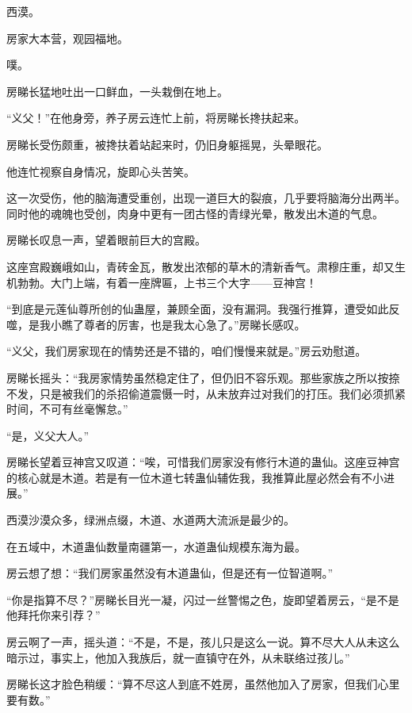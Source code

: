 
\begin{this_body}

西漠。

房家大本营，观园福地。

噗。

房睇长猛地吐出一口鲜血，一头栽倒在地上。

“义父！”在他身旁，养子房云连忙上前，将房睇长搀扶起来。

房睇长受伤颇重，被搀扶着站起来时，仍旧身躯摇晃，头晕眼花。

他连忙视察自身情况，旋即心头苦笑。

这一次受伤，他的脑海遭受重创，出现一道巨大的裂痕，几乎要将脑海分出两半。同时他的魂魄也受创，肉身中更有一团古怪的青绿光晕，散发出木道的气息。

房睇长叹息一声，望着眼前巨大的宫殿。

这座宫殿巍峨如山，青砖金瓦，散发出浓郁的草木的清新香气。肃穆庄重，却又生机勃勃。大门上端，有着一座牌匾，上书三个大字——豆神宫！

“到底是元莲仙尊所创的仙蛊屋，兼顾全面，没有漏洞。我强行推算，遭受如此反噬，是我小瞧了尊者的厉害，也是我太心急了。”房睇长感叹。

“义父，我们房家现在的情势还是不错的，咱们慢慢来就是。”房云劝慰道。

房睇长摇头：“我房家情势虽然稳定住了，但仍旧不容乐观。那些家族之所以按捺不发，只是被我们的杀招偷道震慑一时，从未放弃过对我们的打压。我们必须抓紧时间，不可有丝毫懈怠。”

“是，义父大人。”

房睇长望着豆神宫又叹道：“唉，可惜我们房家没有修行木道的蛊仙。这座豆神宫的核心就是木道。若是有一位木道七转蛊仙辅佐我，我推算此屋必然会有不小进展。”

西漠沙漠众多，绿洲点缀，木道、水道两大流派是最少的。

在五域中，木道蛊仙数量南疆第一，水道蛊仙规模东海为最。

房云想了想：“我们房家虽然没有木道蛊仙，但是还有一位智道啊。”

“你是指算不尽？”房睇长目光一凝，闪过一丝警惕之色，旋即望着房云，“是不是他拜托你来引荐？”

房云啊了一声，摇头道：“不是，不是，孩儿只是这么一说。算不尽大人从未这么暗示过，事实上，他加入我族后，就一直镇守在外，从未联络过孩儿。”

房睇长这才脸色稍缓：“算不尽这人到底不姓房，虽然他加入了房家，但我们心里要有数。”


\end{this_body}
